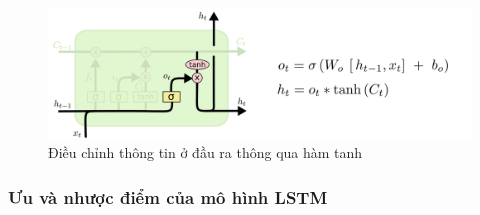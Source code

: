  \begin{figure}[H]
    \centering
    \includegraphics[width=14cm]{Images/Architecture/LSTM3-focus-o.png}
\caption{Điều chỉnh thông tin ở đầu ra thông qua hàm tanh}
\end{figure}
\subsubsection{Ưu và nhược điểm của mô hình LSTM}

